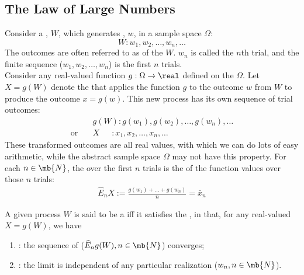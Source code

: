 \documentclass[11pt]{article}
\numberwithin{equation}{section}
\begin{document}
\subsection{The Law of Large Numbers}
Consider a , $W$, which generates , $w$, in a sample space $\Omega$:
$$W: w_1, w_2, \hdots, w_n, \hdots$$
The outcomes are often referred to as  of the  $W$. $w_n$ is called the $n$th trial, and the finite sequence ($w_1, w_2, 
\hdots, w_n$) is the first $n$ trials. \\
Consider any real-valued function $g: \Omega \rightarrow \real$ defined on the  $\Omega$. Let $X = g(W)$ denote the  that applies the function $g$ to the outcome $w$ from $W$ to produce the outcome $x = g(w)$. This new process has its own sequence of trial outcomes:
\begin{align}
	& g(W): g(w_1), g(w_2), \hdots, g(w_n), \hdots \\
    \text{or} \quad & X \quad \,\,\,  : x_1, x_2, \hdots, x_n, \hdots
\end{align}
These transformed outcomes are all real values, with which we can do lots of easy arithmetic, while the abstract sample space $\Omega$ may not have this property.
For each $n \in \mb{N}$, the  over the first $n$ trials is the  of the function values over those $n$ trials:
\begin{align}
	\widehat{E}_nX := \frac{g(w_1) + \hdots + g(w_n)}{n} = \bar{x}_n
\end{align}

 A given process $W$ is said to be a  iff it satisfies the , in that, for any real-valued $X = g(W)$, we have
\begin{enumerate}
	\item {}: the sequence of  ($\widehat{E}_ng(W), n \in \mb{N}$) converges;
	\item {}: the limit is independent of any particular realization ($w_n, n \in \mb{N}$).
\end{enumerate}
\end{document}
